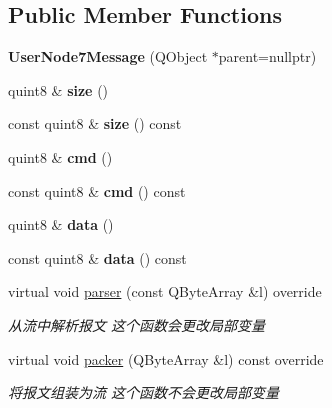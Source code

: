 \subsection*{Public Member Functions}
\begin{DoxyCompactItemize}
\item 
\mbox{\label{class_user_node7_message_a6536c4115dbf7925f371f2e619a252ae}} 
{\bfseries User\+Node7\+Message} (Q\+Object $\ast$parent=nullptr)
\item 
\mbox{\label{class_user_node7_message_afeb0c23721c004cb21f0f74b57d44c3d}} 
quint8 \& {\bfseries size} ()
\item 
\mbox{\label{class_user_node7_message_a697e0a83002ed89aad7eb6d03fea170b}} 
const quint8 \& {\bfseries size} () const
\item 
\mbox{\label{class_user_node7_message_a603ec2762e4cd2a2c9301ea3080bb3af}} 
quint8 \& {\bfseries cmd} ()
\item 
\mbox{\label{class_user_node7_message_af1dcd7b273a53a3c3b24923754a5401c}} 
const quint8 \& {\bfseries cmd} () const
\item 
\mbox{\label{class_user_node7_message_a544bdb0da00c59e2f35b20ea0f7a2dec}} 
quint8 \& {\bfseries data} ()
\item 
\mbox{\label{class_user_node7_message_a0400757e9cc788c4de4a9d7a2ba520f2}} 
const quint8 \& {\bfseries data} () const
\item 
virtual void \mbox{\hyperlink{class_user_node7_message_aac02ca8afa94556daf0513c01f71caa6}{parser}} (const Q\+Byte\+Array \&l) override
\begin{DoxyCompactList}\small\item\em 从流中解析报文 这个函数会更改局部变量 \end{DoxyCompactList}\item 
virtual void \mbox{\hyperlink{class_user_node7_message_a4657923a057070effd2f19278cfb191f}{packer}} (Q\+Byte\+Array \&l) const override
\begin{DoxyCompactList}\small\item\em 将报文组装为流 这个函数不会更改局部变量 \end{DoxyCompactList}\end{DoxyCompactItemize}


